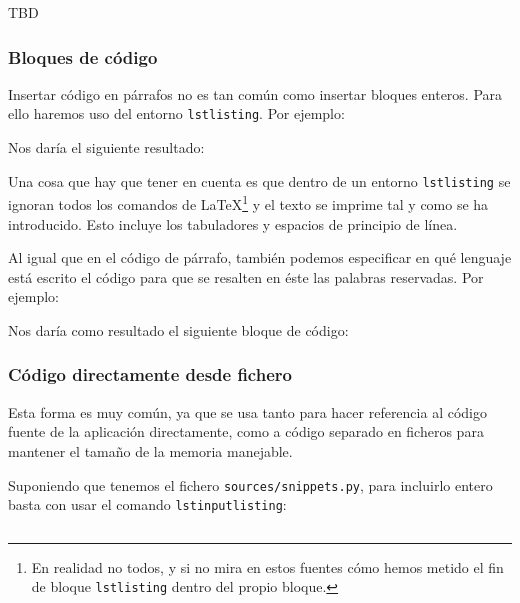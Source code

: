 \documentclass[%
    school=etsisi,%
    type=tfg,%
    degree=61CD,%
]{upm-report}
\begin{document}
TBD

\subsubsection{Bloques de código}

Insertar código en párrafos no es tan común como insertar bloques enteros. Para ello haremos uso del entorno \texttt{lstlisting}. Por ejemplo:



Nos daría el siguiente resultado:



Una cosa que hay que tener en cuenta es que dentro de un entorno \texttt{lstlisting} se ignoran todos los comandos de \LaTeX\space\footnote{En realidad no todos, y si no mira en estos fuentes cómo hemos metido el fin de bloque \texttt{lstlisting} dentro del propio bloque.} y el texto se imprime tal y como se ha introducido. Esto incluye los tabuladores y espacios de principio de línea.

Al igual que en el código de párrafo, también podemos especificar en qué lenguaje está escrito el código para que se resalten en éste las palabras reservadas. Por ejemplo:



Nos daría como resultado el siguiente bloque de código:
 


\subsubsection{Código directamente desde fichero}

Esta forma es muy común, ya que se usa tanto para hacer referencia al código fuente de la aplicación directamente, como a código separado en ficheros para mantener el tamaño de la memoria manejable.

Suponiendo que tenemos el fichero \texttt{sources/snippets.py}, para incluirlo entero basta con usar el comando \texttt{lstinputlisting}:

\begin{lstlisting}[language=TeX]

\end{lstlisting}
\end{document}

